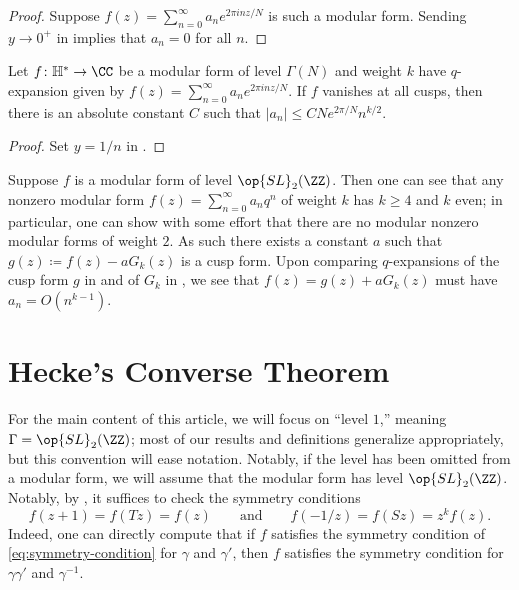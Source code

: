 \documentclass{amsart}
\begin{document}
\begin{proof}
	Suppose $f(z)=\sum_{n=0}^\infty a_ne^{2\pi inz/N}$ is such a modular form. Sending $y\to0^+$ in  implies that $a_n=0$ for all $n$.
\end{proof}
\begin{corollary} \label{cor:cusp-form-coeffs}
	Let $f\colon\mathbb H^*\to\CC$ be a modular form of level $\Gamma(N)$ and weight $k$ have $q$-expansion given by $f(z)=\sum_{n=0}^\infty a_ne^{2\pi inz/N}$. If $f$ vanishes at all cusps, then there is an absolute constant $C$ such that $|a_n|\le CNe^{2\pi/N}n^{k/2}$.
\end{corollary}
\begin{proof}
	Set $y=1/n$ in .
\end{proof}
\begin{remark} \label{rem:mod-forms-cusps}
	Suppose $f$ is a modular form of level $\op{SL}_2(\ZZ)$. Then one can see that any nonzero modular form $f(z)=\sum_{n=0}^\infty a_nq^n$ of weight $k$ has $k\ge4$ and $k$ even; in particular, one can show with some effort that there are no modular nonzero modular forms of weight $2$. As such there exists a constant $a$ such that $g(z)\coloneqq f(z)-aG_k(z)$ is a cusp form. Upon comparing $q$-expansions of the cusp form $g$ in  and of $G_k$ in , we see that $f(z)=g(z)+aG_k(z)$ must have $a_n=O\left(n^{k-1}\right)$.
\end{remark}


\section{Hecke's Converse Theorem}
For the main content of this article, we will focus on ``level $1$,'' meaning $\Gamma=\op{SL}_2(\ZZ)$; most of our results and definitions generalize appropriately, but this convention will ease notation. Notably, if the level has been omitted from a modular form, we will assume that the modular form has level $\op{SL}_2(\ZZ)$. Notably, by , it suffices to check the symmetry conditions
\begin{equation}
	f(z+1)=f(Tz)=f(z)\qquad\text{and}\qquad f(-1/z)=f(Sz)=z^kf(z). \label{eq:level-1-symmetry-condition}
\end{equation}
Indeed, one can directly compute that if $f$ satisfies the symmetry condition of \eqref{eq:symmetry-condition} for $\gamma$ and $\gamma'$, then $f$ satisfies the symmetry condition for $\gamma\gamma'$ and $\gamma^{-1}$.
\end{document}
